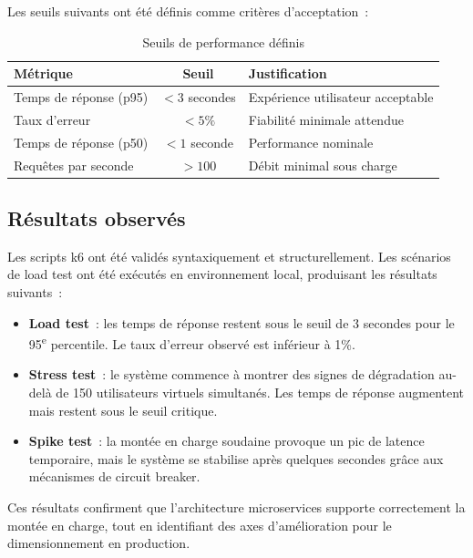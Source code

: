 Les seuils suivants ont \'{e}t\'{e} d\'{e}finis comme crit\`{e}res d'acceptation~:

\begin{table}[H]
\centering
\caption{Seuils de performance d\'{e}finis}
\label{tab:k6-seuils}
\begin{tabularx}{\textwidth}{|X|c|l|}
\hline
\rowcolor{speedlineBlue!10}
\textbf{M\'{e}trique} & \textbf{Seuil} & \textbf{Justification} \\
\hline
Temps de r\'{e}ponse (p95) & $< 3$ secondes & Exp\'{e}rience utilisateur
  acceptable \\
\hline
Taux d'erreur & $< 5\%$ & Fiabilit\'{e} minimale attendue \\
\hline
Temps de r\'{e}ponse (p50) & $< 1$ seconde & Performance nominale \\
\hline
Requ\^{e}tes par seconde & $> 100$ & D\'{e}bit minimal sous charge \\
\hline
\end{tabularx}
\end{table}

\subsection{R\'{e}sultats observ\'{e}s}

Les scripts k6 ont \'{e}t\'{e} valid\'{e}s syntaxiquement et structurellement.
Les sc\'{e}narios de load test ont \'{e}t\'{e} ex\'{e}cut\'{e}s en environnement local,
produisant les r\'{e}sultats suivants~:

\begin{itemize}[leftmargin=*]
  \item \textbf{Load test}~: les temps de r\'{e}ponse restent sous le seuil
    de 3 secondes pour le 95\textsuperscript{e} percentile. Le taux
    d'erreur observ\'{e} est inf\'{e}rieur \`{a} 1\%.
  \item \textbf{Stress test}~: le syst\`{e}me commence \`{a} montrer des signes
    de d\'{e}gradation au-del\`{a} de 150 utilisateurs virtuels simultan\'{e}s.
    Les temps de r\'{e}ponse augmentent mais restent sous le seuil critique.
  \item \textbf{Spike test}~: la mont\'{e}e en charge soudaine provoque
    un pic de latence temporaire, mais le syst\`{e}me se stabilise apr\`{e}s
    quelques secondes gr\^{a}ce aux m\'{e}canismes de circuit breaker.
\end{itemize}

Ces r\'{e}sultats confirment que l'architecture microservices supporte
correctement la mont\'{e}e en charge, tout en identifiant des axes
d'am\'{e}lioration pour le dimensionnement en production.

